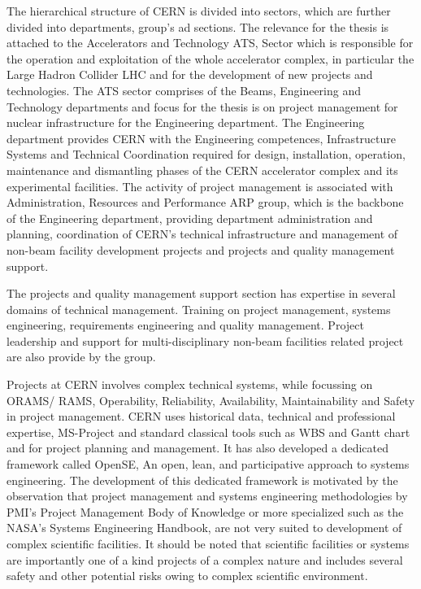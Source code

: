 The hierarchical structure of CERN is divided into sectors, which are further divided into departments, group’s ad sections. The relevance for the thesis is attached to the Accelerators and Technology ATS, Sector which is responsible for the operation and exploitation of the whole accelerator complex, in particular the Large Hadron Collider LHC and for the development of new projects and technologies. The ATS sector comprises of the Beams, Engineering and Technology departments and focus for the thesis is on project management for nuclear infrastructure for the Engineering department. The Engineering department provides CERN with the Engineering competences, Infrastructure Systems and Technical Coordination required for design, installation, operation, maintenance and dismantling phases of the CERN accelerator complex and its experimental facilities. The activity of project management is associated with Administration, Resources and Performance ARP group, which is the backbone of the Engineering department, providing department administration and planning, coordination of CERN's technical infrastructure and management of non-beam facility development projects and projects and quality management support.


The projects and quality management support section has expertise in several domains of technical management. Training on project management, systems engineering, requirements engineering and quality management. Project leadership and support for multi-disciplinary non-beam facilities related project are also provide by the group.

Projects at CERN involves complex technical systems, while focussing on ORAMS/ RAMS, Operability, Reliability, Availability, Maintainability and Safety in project management. CERN uses historical data, technical and professional expertise, MS-Project and standard classical tools such as WBS and Gantt chart and for project planning and management. It has also developed a dedicated framework called OpenSE, An open, lean, and participative approach to systems engineering. The development of this dedicated framework is motivated by the observation that project management and systems engineering methodologies by PMI's Project Management Body of Knowledge or more specialized such as the NASA's Systems Engineering Handbook, are not very suited to development of complex scientific facilities. It should be noted that scientific facilities or systems are importantly one of a kind projects of a complex nature and includes several safety and other potential risks owing to complex scientific environment. 

